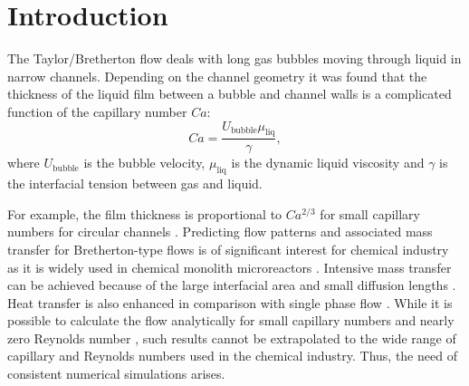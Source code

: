 \documentclass[preprint,12pt]{elsarticle}
\begin{document}
\section{Introduction}
The Taylor/Bretherton \cite{bretherton} flow deals with long gas bubbles moving through liquid in
narrow channels. Depending on the channel geometry it was found \cite{gupta-review} that the 
thickness of the liquid film between a bubble and channel walls
is a complicated function of the capillary number $Ca$:
\begin{equation}
\label{capillary:number:definition}
Ca=\frac{U_{\mathrm{bubble}} \mu_{\mathrm{liq}}}{\gamma},
\end{equation}
where $U_{\mathrm{bubble}}$ is the bubble velocity, $\mu_{\mathrm{liq}}$ is the
dynamic liquid viscosity and $\gamma$ is the interfacial tension between gas and liquid. 

For example, the film thickness
is proportional to $Ca^{2/3}$ for small capillary numbers for circular channels
\cite{bretherton,heil-bretherton}. 
Predicting flow patterns and associated mass transfer for Bretherton-type flows
is of significant interest for chemical industry as it is widely used in chemical monolith
microreactors \cite{kreutzer-pressure-drop}. Intensive mass transfer can be achieved because of the
large interfacial area and small diffusion lengths \cite{cerro-bubble-train}. Heat transfer is
also enhanced in comparison with single phase flow \cite{fukugata-levelset}. While it
is possible to calculate the flow analytically for small capillary numbers and nearly zero Reynolds
number \cite{bretherton}, such
results cannot be extrapolated to the wide range of capillary and Reynolds numbers used in the
chemical industry.  Thus, the need of consistent numerical simulations arises.
\end{document}
